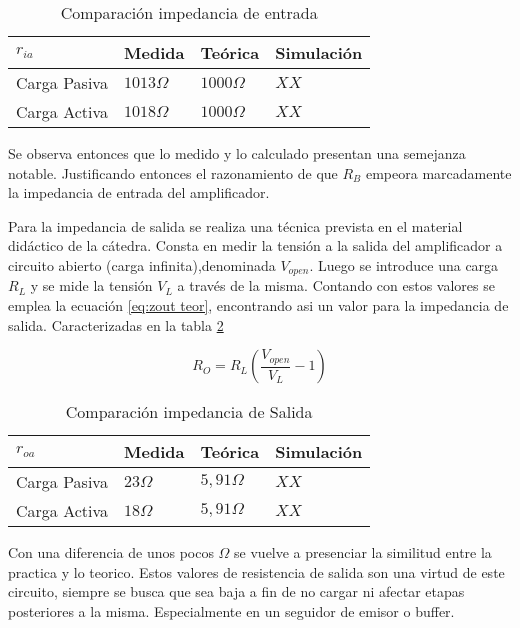 \begin{table}[ht]
    \centering
    \begin{tabular}{|l|l|l|l|}
    \hline
    $r_{ia}$     & Medida       & Teórica         & Simulación \\ \hline
    Carga Pasiva & $1013\Omega$ & $1000\Omega $   &  $XX $          \\ \hline
    Carga Activa & $1018\Omega$ & $1000\Omega $  &  $XX $          \\ \hline
    \end{tabular}
    \caption{Comparación impedancia de entrada}\label{table:Ri comp}
\end{table}

Se observa entonces que lo medido y lo calculado presentan una semejanza notable. Justificando entonces el razonamiento de que $R_B$ empeora marcadamente la impedancia de entrada del amplificador.

Para la impedancia de salida se realiza una técnica prevista en el material didáctico de la cátedra. Consta en medir la tensión a la salida del amplificador a circuito abierto (carga infinita),denominada $V_{open}$. Luego se introduce una carga $R_L$ y se mide la tensión $V_L$ a través de la misma.
Contando con estos valores se emplea la ecuación \ref{eq:zout teor}, encontrando asi un valor para la impedancia de salida. Caracterizadas en la tabla \ref{table:Ro comp}

\begin{equation}
    R_O = R_L(\frac{V_{open}}{V_L}-1)
    \label{eq:zout teor}
\end{equation}

\begin{table}[ht]
    \centering
    \begin{tabular}{|l|l|l|l|}
    \hline
    $r_{oa}$     & Medida     & Teórica         & Simulación \\ \hline
    Carga Pasiva & $23\Omega$ & $5,91\Omega $   &  $XX $          \\ \hline
    Carga Activa & $18\Omega$ &  $5,91\Omega $  &  $XX $          \\ \hline
    \end{tabular}
    \caption{Comparación impedancia de Salida}\label{table:Ro comp}
\end{table}

Con una diferencia de unos pocos $\Omega$ se vuelve a presenciar la similitud entre la practica y lo teorico. Estos valores de resistencia de salida son una virtud de este circuito, siempre se busca que sea baja a fin de no cargar ni afectar etapas posteriores a la misma. Especialmente en un seguidor de emisor o buffer.

